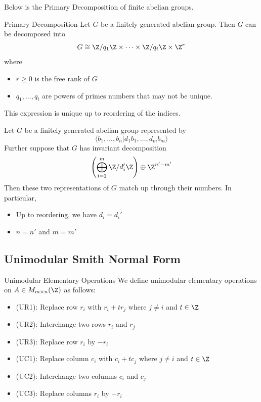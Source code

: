 \documentclass[a4paper]{article}
\begin{document}
Below is the Primary Decomposition of finite abelian groups. 

\begin{thm}{Primary Decomposition}{} Let $G$ be a finitely generated abelian group. Then $G$ can be decomposed into $$G\cong\Z/q_1\Z\times\cdots\times\Z/q_t\Z\times\Z^r$$ where 
\begin{itemize}
\item $r\geq 0$ is the free rank of $G$
\item $q_1,\dots,q_t$ are powers of primes numbers that may not be unique. 
\end{itemize}
This expression is unique up to reordering of the indices. 
\end{thm}

\begin{thm}{}{} Let $G$ be a finitely generated abelian group represented by $$\langle b_1,\dots,b_n|d_1b_1,\dots,d_mb_m\rangle$$ Further suppose that $G$ has invariant decomposition $$\left(\bigoplus_{i=1}^m\Z/d_i'\Z\right)\oplus\Z^{n'-m'}$$ Then these two representations of $G$ match up through their numbers. In particular, 
\begin{itemize}
\item Up to reordering, we have $d_i=d_i'$
\item $n=n'$ and $m=m'$
\end{itemize}
\end{thm}

\subsection{Unimodular Smith Normal Form}
\begin{defn}{Unimodular Elementary Operations}{} We define unimodular elementary operations on $A\in M_{m\times n}(\Z)$ as follows: 
\begin{itemize}
\item (UR1): Replace row $r_i$ with $r_i+tr_j$ where $j\neq i$ and $t\in\Z$
\item (UR2): Interchange two rows $r_i$ and $r_j$
\item (UR3): Replace row $r_i$ by $-r_i$
\item (UC1): Replace column $c_i$ with $c_i+tc_j$ where $j\neq i$ and $t\in\Z$
\item (UC2): Interchange two columns $c_i$ and $c_j$
\item (UC3): Replace columns $r_i$ by $-r_i$
\end{itemize}
\end{defn}
\end{document}
